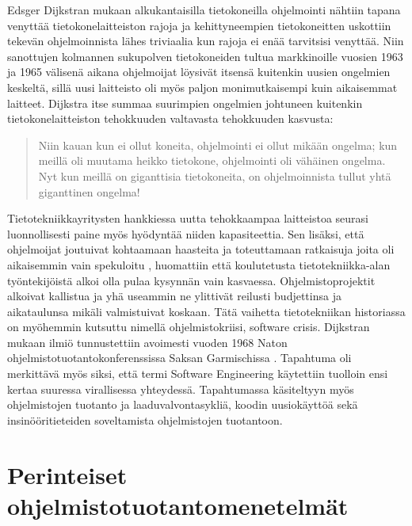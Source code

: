 \documentclass[finnish,12pt]{tktltiki2}
\theoremstyle{definition}
\theoremstyle{remark}
\begin{document}
Edsger Dijkstran mukaan alkukantaisilla tietokoneilla ohjelmointi nähtiin tapana venyttää tietokonelaitteiston rajoja ja kehittyneempien tietokoneitten uskottiin tekevän ohjelmoinnista lähes triviaalia kun rajoja ei enää tarvitsisi venyttää. \cite{Dijkstra:1979:HP:1241515.1241525} Niin sanottujen kolmannen sukupolven tietokoneiden tultua markkinoille vuosien 1963 ja 1965 välisenä aikana ohjelmoijat löysivät itsensä kuitenkin uusien ongelmien keskeltä, sillä uusi laitteisto oli myös paljon monimutkaisempi kuin aikaisemmat laitteet. Dijkstra itse summaa suurimpien ongelmien johtuneen kuitenkin tietokonelaitteiston tehokkuuden valtavasta tehokkuuden kasvusta: \begin{quote}
Niin kauan kun ei ollut koneita, ohjelmointi ei ollut mikään ongelma; kun meillä oli muutama heikko tietokone, ohjelmointi oli vähäinen ongelma. Nyt kun meillä on giganttisia tietokoneita, on ohjelmoinnista tullut yhtä giganttinen ongelma! \cite{Dijkstra:1979:HP:1241515.1241525}
\end{quote} Tietotekniikkayritysten hankkiessa uutta tehokkaampaa laitteistoa seurasi luonnollisesti paine myös hyödyntää niiden kapasiteettia. Sen lisäksi, että ohjelmoijat joutuivat kohtaamaan haasteita ja toteuttamaan ratkaisuja joita oli aikaisemmin vain spekuloitu \cite{Dijkstra:1979:HP:1241515.1241525}, huomattiin että koulutetusta tietotekniikka-alan työntekijöistä alkoi olla pulaa kysynnän vain kasvaessa. \cite{DBLP:reference/se/Grier10} Ohjelmistoprojektit alkoivat kallistua ja yhä useammin ne ylittivät reilusti budjettinsa ja aikataulunsa mikäli valmistuivat koskaan.\cite{CHAOS1994} Tätä vaihetta tietotekniikan historiassa on myöhemmin kutsuttu nimellä ohjelmistokriisi, software crisis. Dijkstran mukaan ilmiö tunnustettiin avoimesti vuoden 1968 Naton ohjelmistotuotantokonferenssissa Saksan Garmischissa \cite{Dijkstra:1979:HP:1241515.1241525}. Tapahtuma oli merkittävä myös siksi, että termi Software Engineering käytettiin tuolloin ensi kertaa suuressa virallisessa yhteydessä. Tapahtumassa käsiteltyyn myös ohjelmistojen tuotanto ja laaduvalvontasykliä, koodin uusiokäyttöä sekä insinööritieteiden soveltamista ohjelmistojen tuotantoon. \cite{DBLP:reference/se/Grier10}



\section{Perinteiset ohjelmistotuotantomenetelmät}
\end{document}
